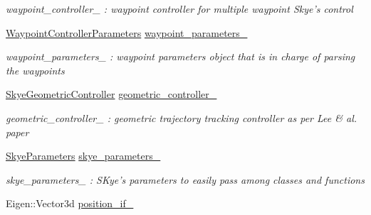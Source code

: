 \begin{DoxyCompactItemize}
\begin{DoxyCompactList}\small\item\em waypoint\-\_\-controller\-\_\- \-: waypoint controller for multiple waypoint Skye's control \end{DoxyCompactList}\item 
\hypertarget{class_pose_controller_node_ab9acbfae326ff745254746afc54244f0}{\hyperlink{struct_waypoint_controller_parameters}{Waypoint\-Controller\-Parameters} \hyperlink{class_pose_controller_node_ab9acbfae326ff745254746afc54244f0}{waypoint\-\_\-parameters\-\_\-}}\label{class_pose_controller_node_ab9acbfae326ff745254746afc54244f0}

\begin{DoxyCompactList}\small\item\em waypoint\-\_\-parameters\-\_\- \-: waypoint parameters object that is in charge of parsing the waypoints \end{DoxyCompactList}\item 
\hypertarget{class_pose_controller_node_afdcf47ae626891c39d3fc6e26ea0b79b}{\hyperlink{class_skye_geometric_controller}{Skye\-Geometric\-Controller} \hyperlink{class_pose_controller_node_afdcf47ae626891c39d3fc6e26ea0b79b}{geometric\-\_\-controller\-\_\-}}\label{class_pose_controller_node_afdcf47ae626891c39d3fc6e26ea0b79b}

\begin{DoxyCompactList}\small\item\em geometric\-\_\-controller\-\_\- \-: geometric trajectory tracking controller as per Lee \& al. paper \end{DoxyCompactList}\item 
\hypertarget{class_pose_controller_node_aa24363e4826775d066c24f561f16805b}{\hyperlink{struct_skye_parameters}{Skye\-Parameters} \hyperlink{class_pose_controller_node_aa24363e4826775d066c24f561f16805b}{skye\-\_\-parameters\-\_\-}}\label{class_pose_controller_node_aa24363e4826775d066c24f561f16805b}

\begin{DoxyCompactList}\small\item\em skye\-\_\-parameters\-\_\- \-: S\-Kye's parameters to easily pass among classes and functions \end{DoxyCompactList}\item 
\hypertarget{class_pose_controller_node_a6b6ae82cbda6a7380f9c068fc3a9d135}{Eigen\-::\-Vector3d \hyperlink{class_pose_controller_node_a6b6ae82cbda6a7380f9c068fc3a9d135}{position\-\_\-if\-\_\-}}\label{class_pose_controller_node_a6b6ae82cbda6a7380f9c068fc3a9d135}


\end{DoxyCompactItemize}
